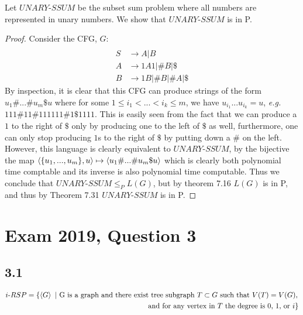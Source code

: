 \documentclass[a4paper,11pt]{article}
\newcommand{\eg}{\emph{e.g.} }
\numberwithin{equation}{section}
\begin{document}
Let $ UNARY\text{-}SSUM $ be the subset sum problem where all numbers are represented in unary numbers. We show that $ UNARY\text{-}SSUM $ is in P.
\begin{proof}
	Consider the CFG, $ G $:\begin{equation*}
	\begin{aligned}\\
	S&\to A\vert B\\
	A&\to 1A1\vert \# B\vert \$\\
	B&\to1B\vert \#B\vert \#A\vert \$
	\end{aligned}
	\end{equation*}
	By inspection, it is clear that this CFG can produce strings of the form $ u_1\#...\#u_m\$u $ where for some $ 1\leq i_1<...<i_k\leq m $, we have $ u_{i_1}...u_{i_k}=u $, \eg $ 111\#11\#111111\#1\$1111 $. This is easily seen from the fact that we can produce a $ 1 $ to the right of $ \$ $ only by producing one to the left of $ \$ $ as well, furthermore, one can only stop producing $ 1 $s to the right of $ \$ $ by putting down a $ \# $ on the left. However, this language is clearly equivalent to $ UNARY\text{-}SSUM $, by the bijective the map $ \braket{\{u_1,...,u_m\},u}\mapsto \braket{u_1\#...\#u_m\$u} $ which is clearly both polynomial time comptable and its inverse is also polynomial time computable. Thus we conclude that $ UNARY\text{-}SSUM\leq_P L(G) $, but by theorem 7.16 $ L(G) $ is in P, and thus by Theorem 7.31 $ UNARY\text{-}SSUM $ is in P.
\end{proof}


\section*{Exam 2019, Question 3}
\subsection*{3.1}
\begin{equation*}
	\begin{aligned}
	i\text{-}RSP=\left\{\braket{G}\ \vert\ \text{G}\text{ is a graph and there exist tree subgraph $ T\subset G $ such that $ V(T)=V(G) $,}\right.\\\left.\text{ and for any vertex in $ T $ the degree is 0, 1, or $ i $} \right\} 
	\end{aligned}
\end{equation*}
\end{document}
